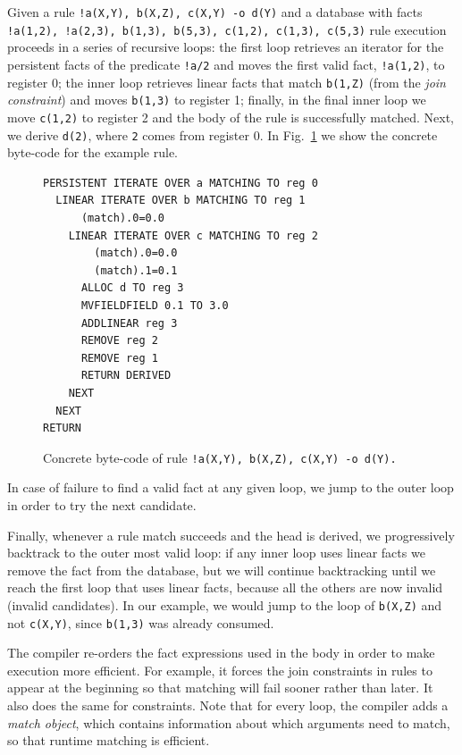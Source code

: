 Given a rule \texttt{!a(X,Y), b(X,Z), c(X,Y) -o d(Y)} and a database with facts
\texttt{!a(1,2), !a(2,3), b(1,3), b(5,3), c(1,2), c(1,3), c(5,3)} rule execution proceeds
in a series of recursive loops: the first loop retrieves an iterator for the persistent facts
of the predicate \texttt{!a/2} and moves the first valid fact, \texttt{!a(1,2)},
to register 0; the inner loop retrieves linear facts that match \texttt{b(1,Z)} (from the
\emph{join constraint}) and moves \texttt{b(1,3)} to register 1; finally, in the final inner
loop we move \texttt{c(1,2)} to register 2 and the body of the rule is successfully matched. Next, we
derive \texttt{d(2)}, where \texttt{2} comes from register 0.
In Fig.~\ref{fig:byte_code} we show the concrete byte-code for the example rule.

\begin{figure}
\scriptsize\begin{Verbatim}
PERSISTENT ITERATE OVER a MATCHING TO reg 0
  LINEAR ITERATE OVER b MATCHING TO reg 1
      (match).0=0.0
    LINEAR ITERATE OVER c MATCHING TO reg 2
        (match).0=0.0
        (match).1=0.1
      ALLOC d TO reg 3
      MVFIELDFIELD 0.1 TO 3.0
      ADDLINEAR reg 3
      REMOVE reg 2
      REMOVE reg 1
      RETURN DERIVED
    NEXT
  NEXT
RETURN
\end{Verbatim}
\caption{Concrete byte-code of rule \texttt{!a(X,Y), b(X,Z), c(X,Y) -o d(Y).}}
\label{fig:byte_code}
\end{figure}

In case of failure to find a valid fact at any given loop, we jump
to the outer loop in order to try the next candidate.

Finally, whenever a rule match succeeds and the head is derived, we progressively backtrack to the outer most valid loop:
if any inner loop uses linear facts we remove the fact from the database, but we will
continue backtracking until we reach the first loop that uses linear facts,
because all the others are now invalid (invalid candidates). In our example, we would jump to the
loop of \texttt{b(X,Z)} and not \texttt{c(X,Y)}, since \texttt{b(1,3)} was already consumed.

The compiler re-orders the fact expressions used in the body in order to make execution more
efficient. For example, it forces the join constraints in rules to appear at the beginning so
that matching will fail sooner rather than later. It also does the same for constraints.
Note that for every loop, the compiler adds a \emph{match object}, which contains information
about which arguments need to match, so that runtime matching is efficient.

